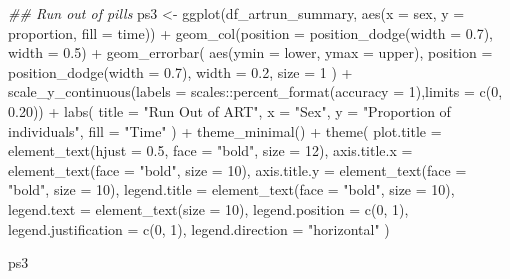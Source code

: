 \documentclass[
  letterpaper,
  DIV=11,
  numbers=noendperiod]{scrartcl}
\newenvironment{Shaded}{\begin{snugshade}}{\end{snugshade}}
\newcommand{\AttributeTok}[1]{\textcolor[rgb]{0.40,0.45,0.13}{#1}}
\newcommand{\DecValTok}[1]{\textcolor[rgb]{0.68,0.00,0.00}{#1}}
\newcommand{\DocumentationTok}[1]{\textcolor[rgb]{0.37,0.37,0.37}{\textit{#1}}}
\newcommand{\FloatTok}[1]{\textcolor[rgb]{0.68,0.00,0.00}{#1}}
\newcommand{\FunctionTok}[1]{\textcolor[rgb]{0.28,0.35,0.67}{#1}}
\newcommand{\NormalTok}[1]{\textcolor[rgb]{0.00,0.23,0.31}{#1}}
\newcommand{\OtherTok}[1]{\textcolor[rgb]{0.00,0.23,0.31}{#1}}
\newcommand{\SpecialCharTok}[1]{\textcolor[rgb]{0.37,0.37,0.37}{#1}}
\newcommand{\StringTok}[1]{\textcolor[rgb]{0.13,0.47,0.30}{#1}}
\begin{document}
\begin{Shaded}
\begin{Highlighting}[]
\DocumentationTok{\#\# Run out of pills}
\NormalTok{ps3 }\OtherTok{\textless{}{-}} \FunctionTok{ggplot}\NormalTok{(df\_artrun\_summary, }\FunctionTok{aes}\NormalTok{(}\AttributeTok{x =}\NormalTok{ sex, }\AttributeTok{y =}\NormalTok{ proportion, }\AttributeTok{fill =}\NormalTok{ time)) }\SpecialCharTok{+}
  \FunctionTok{geom\_col}\NormalTok{(}\AttributeTok{position =} \FunctionTok{position\_dodge}\NormalTok{(}\AttributeTok{width =} \FloatTok{0.7}\NormalTok{), }\AttributeTok{width =} \FloatTok{0.5}\NormalTok{) }\SpecialCharTok{+}
  \FunctionTok{geom\_errorbar}\NormalTok{(}
    \FunctionTok{aes}\NormalTok{(}\AttributeTok{ymin =}\NormalTok{ lower, }\AttributeTok{ymax =}\NormalTok{ upper),}
    \AttributeTok{position =} \FunctionTok{position\_dodge}\NormalTok{(}\AttributeTok{width =} \FloatTok{0.7}\NormalTok{),}
    \AttributeTok{width =} \FloatTok{0.2}\NormalTok{,}
    \AttributeTok{size =} \DecValTok{1}
\NormalTok{  ) }\SpecialCharTok{+}
  \FunctionTok{scale\_y\_continuous}\NormalTok{(}\AttributeTok{labels =}\NormalTok{ scales}\SpecialCharTok{::}\FunctionTok{percent\_format}\NormalTok{(}\AttributeTok{accuracy =} \DecValTok{1}\NormalTok{),}\AttributeTok{limits =} \FunctionTok{c}\NormalTok{(}\DecValTok{0}\NormalTok{, }\FloatTok{0.20}\NormalTok{)) }\SpecialCharTok{+}
  \FunctionTok{labs}\NormalTok{(}
    \AttributeTok{title =}  \StringTok{"Run Out of ART"}\NormalTok{,}
    \AttributeTok{x =} \StringTok{"Sex"}\NormalTok{,}
    \AttributeTok{y =} \StringTok{"Proportion of individuals"}\NormalTok{,}
    \AttributeTok{fill =} \StringTok{"Time"}
\NormalTok{  ) }\SpecialCharTok{+}
  \FunctionTok{theme\_minimal}\NormalTok{() }\SpecialCharTok{+}
  \FunctionTok{theme}\NormalTok{(}
    \AttributeTok{plot.title =}  \FunctionTok{element\_text}\NormalTok{(}\AttributeTok{hjust =} \FloatTok{0.5}\NormalTok{, }\AttributeTok{face =} \StringTok{"bold"}\NormalTok{, }\AttributeTok{size =} \DecValTok{12}\NormalTok{),}
    \AttributeTok{axis.title.x =} \FunctionTok{element\_text}\NormalTok{(}\AttributeTok{face =} \StringTok{"bold"}\NormalTok{, }\AttributeTok{size =} \DecValTok{10}\NormalTok{),}
    \AttributeTok{axis.title.y =} \FunctionTok{element\_text}\NormalTok{(}\AttributeTok{face =} \StringTok{"bold"}\NormalTok{, }\AttributeTok{size =} \DecValTok{10}\NormalTok{),}
    \AttributeTok{legend.title =} \FunctionTok{element\_text}\NormalTok{(}\AttributeTok{face =} \StringTok{"bold"}\NormalTok{, }\AttributeTok{size =} \DecValTok{10}\NormalTok{),}
    \AttributeTok{legend.text =} \FunctionTok{element\_text}\NormalTok{(}\AttributeTok{size =} \DecValTok{10}\NormalTok{),}
    \AttributeTok{legend.position =} \FunctionTok{c}\NormalTok{(}\DecValTok{0}\NormalTok{, }\DecValTok{1}\NormalTok{),}
    \AttributeTok{legend.justification =} \FunctionTok{c}\NormalTok{(}\DecValTok{0}\NormalTok{, }\DecValTok{1}\NormalTok{),}
    \AttributeTok{legend.direction =} \StringTok{"horizontal"}
\NormalTok{  )}

\NormalTok{ps3}
\end{Highlighting}
\end{Shaded}
\end{document}
